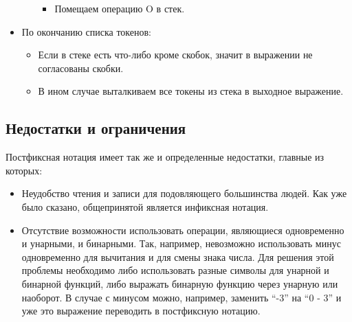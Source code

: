 \begin{itemize}
\begin{itemize}
\begin{itemize}
          \item Помещаем операцию O в стек.
        \end{itemize}
    \end{itemize}
  \item По окончанию списка токенов:
    \begin{itemize}
      \item	Если в стеке есть что-либо кроме скобок, значит в выражении не согласованы скобки.
      \item В ином случае выталкиваем все токены из стека в выходное выражение. 
    \end{itemize}
\end{itemize}

\subsection{Недостатки и ограничения}
Постфиксная нотация имеет так же и определенные недостатки, главные из которых:
\begin{itemize}
  \item Неудобство чтения и записи для подовляющего большинства людей. Как уже было сказано,
    общепринятой является инфиксная нотация.
  \item Отсутствие возможности использовать операции, являющиеся одновременно и унарными,
    и бинарными. Так, например, невозможно использовать минус одновременно для вычитания и для 
    смены знака числа. Для решения этой проблемы необходимо либо использовать разные 
    символы для унарной и бинарной функций, либо выражать бинарную функцию через унарную
    или наоборот. В случае с минусом можно, например, заменить ``-3'' на ``0 - 3''
    и уже это выражение переводить в постфиксную нотацию.
\end{itemize}
